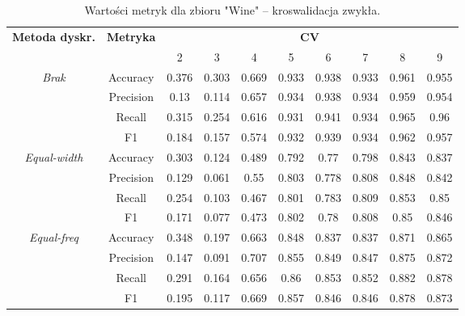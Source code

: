     \begin{table}[H]
        \center
        \caption{Wartości metryk dla zbioru "Wine" -- kroswalidacja zwykła.}
        \begin{tabular}{|c|c|c|c|c|c|c|c|c|c|}
            \hline
            \multirow{2}{*}{\textbf{Metoda dyskr.}} & \multirow{2}{*}{\textbf{Metryka}} & \multicolumn{8}{|c|}{\textbf{CV}} \\ \cline{3-10}
                            &  & 2 & 3 & 4 & 5 & 6 & 7 & 8 & 9 \\ \hline
            \multirow{4}{*}{\textit{Brak}}  & Accuracy & 0.376 & 0.303 & 0.669 & 0.933 & 0.938 & 0.933 & 0.961 & 0.955 \\ \cline{2-10}
                                             & Precision & 0.13 & 0.114 & 0.657 & 0.934 & 0.938 & 0.934 & 0.959 & 0.954 \\ \cline{2-10}
                                             & Recall & 0.315 & 0.254 & 0.616 & 0.931 & 0.941 & 0.934 & 0.965 & 0.96 \\ \cline{2-10}
                                             & F1 & 0.184 & 0.157 & 0.574 & 0.932 & 0.939 & 0.934 & 0.962 & 0.957 \\ \hline \hline


                                            \multirow{4}{*}{\textit{Equal-width}}  & Accuracy & 0.303 & 0.124 & 0.489 & 0.792 & 0.77 & 0.798 & 0.843 & 0.837 \\ \cline{2-10}
                                             & Precision & 0.129 & 0.061 & 0.55 & 0.803 & 0.778 & 0.808 & 0.848 & 0.842 \\ \cline{2-10}
                                             & Recall & 0.254 & 0.103 & 0.467 & 0.801 & 0.783 & 0.809 & 0.853 & 0.85 \\ \cline{2-10}
                                             & F1 & 0.171 & 0.077 & 0.473 & 0.802 & 0.78 & 0.808 & 0.85 & 0.846 \\ \hline \hline


                                            \multirow{4}{*}{\textit{Equal-freq}}  & Accuracy & 0.348 & 0.197 & 0.663 & 0.848 & 0.837 & 0.837 & 0.871 & 0.865 \\ \cline{2-10}
                                             & Precision & 0.147 & 0.091 & 0.707 & 0.855 & 0.849 & 0.847 & 0.875 & 0.872 \\ \cline{2-10}
                                             & Recall & 0.291 & 0.164 & 0.656 & 0.86 & 0.853 & 0.852 & 0.882 & 0.878 \\ \cline{2-10}
                                             & F1 & 0.195 & 0.117 & 0.669 & 0.857 & 0.846 & 0.846 & 0.878 & 0.873 \\ \hline \hline



\end{tabular}
\end{table}
